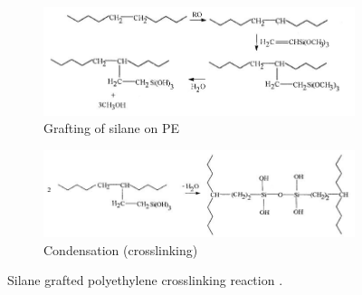 \documentclass[12pt]{report}
\begin{document}
\begin{figure}[H]
\captionsetup[subfigure]{justification=raggedright}

\centering

\begin{subfigure}{.9\textwidth}
    \centering
    \includegraphics[width=\textwidth]{grafting_of_silane_on_pe.jpg}
    \caption{Grafting of silane on PE}
\end{subfigure}
\begin{subfigure}{.9\textwidth}
    \centering
    \includegraphics[width=\textwidth]{condensation.jpg}
    \caption{Condensation (crosslinking)}
\end{subfigure}

\caption{Silane grafted polyethylene crosslinking reaction \cite{kurtz2009cross}.}
\label{ch3:figure:reaction}
\end{figure}
\end{document}
